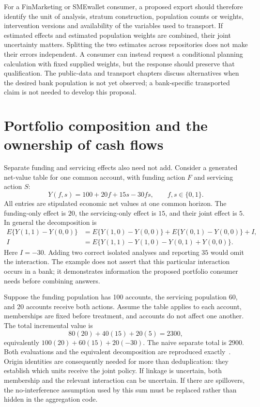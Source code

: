 For a FinMarketing or SMEwallet consumer, a proposed export should therefore
identify the unit of analysis, stratum construction, population counts or
weights, intervention versions and availability of the variables used to
transport. If estimated effects and estimated population weights are combined,
their joint uncertainty matters. Splitting the two estimates across
repositories does not make their errors independent. A consumer can instead
request a conditional planning calculation with fixed supplied weights, but
the response should preserve that qualification. The public-data and transport
chapters discuss alternatives when the desired bank population is not yet
observed; a bank-specific transported claim is not needed to develop this
proposal.

\section{Portfolio composition and the ownership of cash flows}

Separate funding and servicing effects also need not add. Consider a
generated net-value table for one common account, with funding action $F$
and servicing action $S$:
\[
 Y(f,s)=100+20f+15s-30fs,\qquad f,s\in\{0,1\}.
\]
All entries are stipulated economic net values at one common horizon. The
funding-only effect is $20$, the servicing-only effect is $15$, and their
joint effect is $5$. In general the decomposition is
\begin{align}
 E\{Y(1,1)-Y(0,0)\}
   &=E\{Y(1,0)-Y(0,0)\}+E\{Y(0,1)-Y(0,0)\}+I,\\
 I&=E\{Y(1,1)-Y(1,0)-Y(0,1)+Y(0,0)\}.
 \label{exec13:i3-interaction}
\end{align}
Here $I=-30$. Adding two correct isolated analyses and reporting $35$
would omit the interaction. The example does not assert that this particular
interaction occurs in a bank; it demonstrates information the proposed
portfolio consumer needs before combining answers.

Suppose the funding population has 100 accounts, the servicing population
60, and 20 accounts receive both actions. Assume the table applies to each
account, memberships are fixed before treatment, and accounts do not affect
one another. The total incremental value is
\[
 80(20)+40(15)+20(5)=2300,
\]
equivalently $100(20)+60(15)+20(-30)$. The naive separate total is
$2900$. Both evaluations and the equivalent decomposition are reproduced
exactly~\citep{exec13_i3_composition}. Origin identities are consequently
needed for more than deduplication: they establish which units receive the
joint policy. If linkage is uncertain, both membership and the relevant
interaction can be uncertain. If there are spillovers, the no-interference
assumption used by this sum must be replaced rather than hidden in the
aggregation code.

